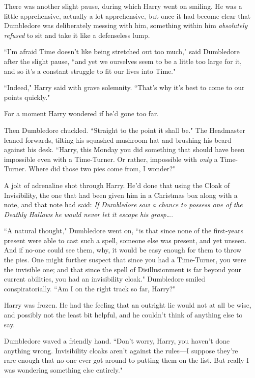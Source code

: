 There was another slight pause, during which Harry went on smiling. He was a little apprehensive, actually a lot apprehensive, but once it had become clear that Dumbledore was deliberately messing with him, something within him \emph{absolutely refused} to sit and take it like a defenseless lump.

``I'm afraid Time doesn't like being stretched out too much," said Dumbledore after the slight pause, ``and yet we ourselves seem to be a little too large for it, and so it's a constant struggle to fit our lives into Time."

``Indeed," Harry said with grave solemnity. ``That's why it's best to come to our points quickly."

For a moment Harry wondered if he'd gone too far.

Then Dumbledore chuckled. ``Straight to the point it shall be." The Headmaster leaned forwards, tilting his squashed mushroom hat and brushing his beard against his desk. ``Harry, this Monday you did something that should have been impossible even with a Time-Turner. Or rather, impossible with \emph{only} a Time-Turner. Where did those two pies come from, I wonder?"

A jolt of adrenaline shot through Harry. He'd done that using the Cloak of Invisibility, the one that had been given him in a Christmas box along with a note, and that note had said: \emph{If Dumbledore saw a chance to possess one of the Deathly Hallows he would never let it escape his grasp{\ldots}.}

``A natural thought," Dumbledore went on, ``is that since none of the first-years present were able to cast such a spell, someone else was present, and yet unseen. And if no-one could see them, why, it would be easy enough for them to throw the pies. One might further suspect that since you had a Time-Turner, you were the invisible one; and that since the spell of Disillusionment is far beyond your current abilities, you had an invisibility cloak." Dumbledore smiled conspiratorially. ``Am I on the right track so far, Harry?"

Harry was frozen. He had the feeling that an outright lie would not at all be wise, and possibly not the least bit helpful, and he couldn't think of anything else to say.

Dumbledore waved a friendly hand. ``Don't worry, Harry, you haven't done anything wrong. Invisibility cloaks aren't against the rules—I suppose they're rare enough that no-one ever got around to putting them on the list. But really I was wondering something else entirely."


